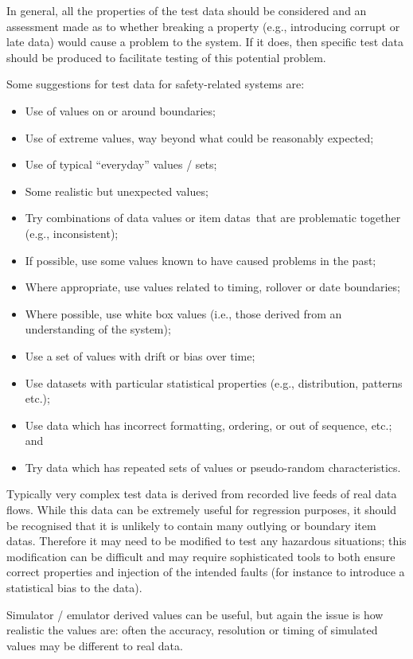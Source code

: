 In general, all the properties of the test data should be considered and an assessment made as to whether breaking a property (e.g., introducing corrupt or late data) would cause a problem to the system. If it does, then specific test data should be produced to facilitate testing of this potential problem.

Some suggestions for test data for safety-related systems are:
\begin{itemize}
  \item Use of values on or around boundaries;
  \item Use of extreme values, way beyond what could be reasonably expected;
  \item Use of typical ``everyday'' values / sets;
  \item Some realistic but unexpected values;
  \item Try combinations of data values or \cbstart\glspl{item data}\cbend\ that are problematic together (e.g., inconsistent);
  \item If possible, use some values known to have caused problems in the past;
  \item Where appropriate, use values related to timing, rollover or date boundaries;
  \item Where possible, use white box values (i.e., those derived from an understanding of the system);
  \item Use a set of values with drift or bias over time;
  \item Use \glspl{dataset} with particular statistical properties (e.g., distribution, patterns etc.);
  \item Use data which has incorrect formatting, ordering, or out of sequence, etc.; and
  \item Try data which has repeated sets of values or pseudo-random characteristics.
\end{itemize}
Typically very complex test data is derived from recorded live feeds of real data flows. While this data can be extremely useful for regression purposes, it should be recognised that it is unlikely to contain many outlying or boundary \glspl{item data}. Therefore it may need to be modified to test any hazardous situations; this modification can be difficult and may require sophisticated tools to both ensure correct properties and injection of the intended faults (for instance to introduce a statistical bias to the data).

Simulator / emulator derived values can be useful, but again the issue is how realistic the values are: often the \gls{accuracy}, \gls{resolution} or timing of simulated values may be different to real data.

